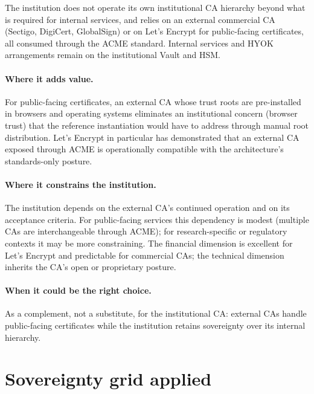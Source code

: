 \begin{alternativebox}
\noindent The institution does not operate its own institutional
CA hierarchy beyond what is required for internal services, and
relies on an external commercial CA (Sectigo, DigiCert, GlobalSign)
or on Let's Encrypt for public-facing certificates, all consumed
through the ACME standard. Internal services and HYOK arrangements
remain on the institutional Vault and HSM.
\end{alternativebox}

\paragraph{Where it adds value.} For public-facing certificates, an
external CA whose trust roots are pre-installed in browsers and
operating systems eliminates an institutional concern (browser
trust) that the reference instantiation would have to address
through manual root distribution. Let's Encrypt in particular has
demonstrated that an external CA exposed through ACME is
operationally compatible with the architecture's standards-only
posture.

\paragraph{Where it constrains the institution.} The institution
depends on the external CA's continued operation and on its
acceptance criteria. For public-facing services this dependency is
modest (multiple CAs are interchangeable through ACME); for
research-specific or regulatory contexts it may be more
constraining. The financial dimension is excellent for Let's
Encrypt and predictable for commercial CAs; the technical dimension
inherits the CA's open or proprietary posture.

\paragraph{When it could be the right choice.} As a complement,
not a substitute, for the institutional CA: external CAs handle
public-facing certificates while the institution retains
sovereignty over its internal hierarchy.

\section{Sovereignty grid applied}
\label{sec:cr-sovereignty}

